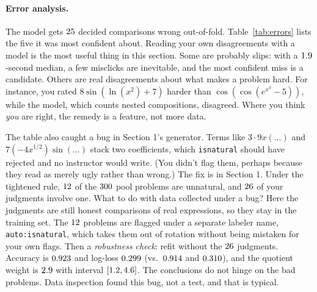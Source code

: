 \documentclass[11pt]{article}
\theoremstyle{definition}
\theoremstyle{plain}
\theoremstyle{remark}
\newcommand{\code}[1]{\texttt{#1}}
\renewcommand{\_}{\oldunderscore\allowbreak}
\begin{document}
\paragraph{Error analysis.}
The model gets $25$ decided comparisons wrong out-of-fold. Table~\ref{tab:errors} lists the five it was most confident about. Reading
your own disagreements with a model is the most useful thing in this section. Some are probably slips: with a $1.9$-second median, a few misclicks are
inevitable, and the most confident miss is a candidate. Others are real disagreements about what makes a problem hard. For instance, you rated
$8\sin(\ln(x^2)+7)$ harder than $\cos(\cos(e^{x^3}-5))$, while the model, which counts nested compositions, disagreed. Where you think \emph{you} are right,
the remedy is a feature, not more data.

\begin{table}[h]\centering\footnotesize

\caption{The model's five most confident out-of-fold mistakes. $P_{\text{model}}$ is the probability it gave to the answer you did not choose.}\label{tab:errors}
\end{table}

The table also caught a bug in Section 1's generator. Terms like $3\cdot 9x(\ldots)$ and $7(-4x^{1/2})\sin(\ldots)$ stack two coefficients, which
\code{is\_natural} should have rejected and no instructor would write. (You didn't flag them, perhaps because they read as merely ugly rather than
wrong.) The fix is in Section 1. Under the tightened rule, $12$ of the $300$ pool problems are unnatural, and $26$ of your judgments involve one.
What to do with data collected under a bug? Here the judgments are still honest comparisons of real expressions, so they stay in the training set.
The $12$ problems are flagged under a separate labeler name, \code{auto:is\_natural}, which takes them out of rotation without being mistaken for your own flags.
Then a \emph{robustness check}: refit without the $26$ judgments. Accuracy is $0.923$ and log-loss $0.299$ (vs.\ $0.914$ and $0.310$), and the
quotient weight is $2.9$ with interval $[1.2,4.6]$. The conclusions do not hinge on the bad problems. Data inspection found this
bug, not a test, and that is typical.
\end{document}
